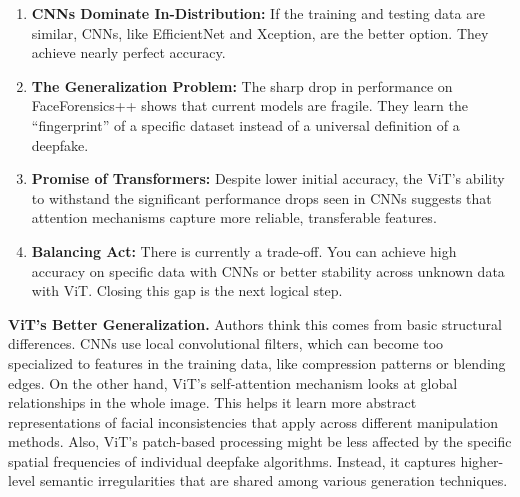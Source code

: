 \documentclass[runningheads]{llncs}
\begin{document}
\begin{enumerate}
    \item \textbf{CNNs Dominate In-Distribution:} If the training and testing data are similar, CNNs, like EfficientNet and Xception, are the better option. They achieve nearly perfect accuracy.

    \item \textbf{The Generalization Problem:} The sharp drop in performance on FaceForensics++ shows that current models are fragile. They learn the ``fingerprint'' of a specific dataset instead of a universal definition of a deepfake.

    \item \textbf{Promise of Transformers:} Despite lower initial accuracy, the ViT's ability to withstand the significant performance drops seen in CNNs suggests that attention mechanisms capture more reliable, transferable features.

    \item \textbf{Balancing Act:} There is currently a trade-off. You can achieve high accuracy on specific data with CNNs or better stability across unknown data with ViT. Closing this gap is the next logical step.
\end{enumerate}

\textbf{ViT's Better Generalization.} Authors think this comes from basic structural differences. CNNs use local convolutional filters, which can become too specialized to features in the training data, like compression patterns or blending edges. On the other hand, ViT's self-attention mechanism looks at global relationships in the whole image. This helps it learn more abstract representations of facial inconsistencies that apply across different manipulation methods. Also, ViT's patch-based processing might be less affected by the specific spatial frequencies of individual deepfake algorithms. Instead, it captures higher-level semantic irregularities that are shared among various generation techniques.
\end{document}
